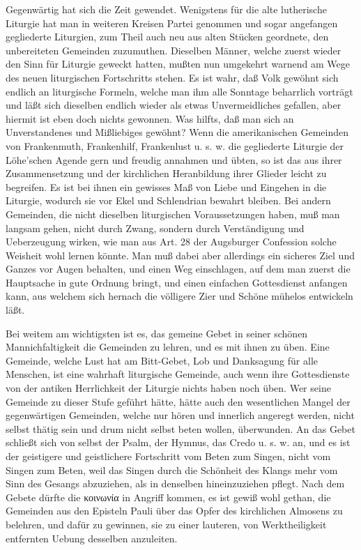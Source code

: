 Gegenwärtig hat sich die Zeit gewendet. Wenigstens für die alte lutherische Liturgie hat man in weiteren Kreisen Partei genommen und sogar angefangen gegliederte Liturgien, zum Theil auch neu aus alten Stücken geordnete, den unbereiteten Gemeinden zuzumuthen. Dieselben Männer, welche zuerst wieder den Sinn für Liturgie geweckt hatten, mußten nun umgekehrt warnend am Wege des neuen liturgischen Fortschritts stehen. Es ist wahr, daß Volk gewöhnt sich endlich an liturgische Formeln, welche man ihm alle Sonntage beharrlich vorträgt und läßt sich dieselben endlich wieder als etwas Unvermeidliches gefallen, aber hiermit ist eben doch nichts gewonnen. Was hilfts, daß man sich an Unverstandenes und Mißliebiges gewöhnt? Wenn die amerikanischen Gemeinden von Frankenmuth, Frankenhilf, Frankenlust u. s. w. die gegliederte
Liturgie der Löhe’schen Agende gern und freudig annahmen und übten, so ist das aus ihrer Zusammensetzung und der kirchlichen Heranbildung ihrer Glieder leicht zu begreifen. Es ist bei ihnen ein gewisses Maß von Liebe und Eingehen in die Liturgie, wodurch sie vor Ekel und Schlendrian bewahrt bleiben. Bei andern Gemeinden, die nicht dieselben liturgischen Voraussetzungen haben, muß man langsam gehen, nicht durch Zwang, sondern durch Verständigung und Ueberzeugung wirken, wie man aus Art. 28 der Augsburger Confession solche Weisheit wohl lernen könnte. Man muß dabei aber allerdings ein sicheres Ziel und Ganzes vor Augen behalten, und einen Weg einschlagen, auf dem man zuerst die Hauptsache in gute Ordnung bringt, und einen einfachen Gottesdienst anfangen kann, aus welchem sich hernach die völligere Zier und Schöne mühelos entwickeln läßt.

Bei weitem am wichtigsten ist es, das gemeine Gebet in seiner schönen Mannichfaltigkeit die Gemeinden zu lehren, und es mit ihnen zu üben. Eine Gemeinde, welche Lust hat am Bitt-Gebet, Lob und Danksagung für alle Menschen, ist eine wahrhaft liturgische Gemeinde, auch wenn ihre Gottesdienste von der antiken Herrlichkeit der Liturgie nichts haben noch üben. Wer seine Gemeinde zu dieser Stufe geführt hätte, hätte auch den wesentlichen Mangel der gegenwärtigen Gemeinden, welche nur hören und innerlich angeregt werden, nicht selbst thätig sein und drum nicht selbst beten wollen, überwunden. An das Gebet schließt sich von selbst der Psalm, der Hymnus, das Credo u. s. w. an, und es ist der geistigere
und geistlichere Fortschritt vom Beten zum Singen, nicht vom Singen zum Beten, weil das Singen durch die Schönheit des Klangs mehr vom Sinn des Gesangs abzuziehen, als in denselben hineinzuziehen pflegt. Nach dem Gebete dürfte die κοινωνία in Angriff kommen, es ist gewiß wohl gethan, die Gemeinden aus den Episteln Pauli über das Opfer des kirchlichen Almosens zu belehren, und dafür zu gewinnen, sie zu einer lauteren, von Werktheiligkeit entfernten Uebung desselben anzuleiten.

